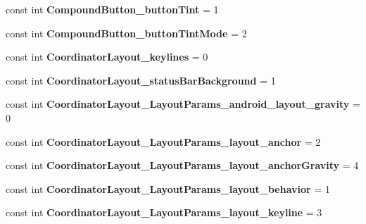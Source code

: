 \begin{DoxyCompactItemize}
const int {\bfseries Compound\+Button\+\_\+button\+Tint} = 1
\item 
\mbox{\label{classXaria_1_1Resource_1_1Styleable_a937c36ddb3e245cdb5b919aa3a6582f9}} 
const int {\bfseries Compound\+Button\+\_\+button\+Tint\+Mode} = 2
\item 
\mbox{\label{classXaria_1_1Resource_1_1Styleable_a0c87026a6c2e0cfe07cfac91069daa77}} 
const int {\bfseries Coordinator\+Layout\+\_\+keylines} = 0
\item 
\mbox{\label{classXaria_1_1Resource_1_1Styleable_a8e5902b5ac3e4c84ccbcf705e83f5a36}} 
const int {\bfseries Coordinator\+Layout\+\_\+status\+Bar\+Background} = 1
\item 
\mbox{\label{classXaria_1_1Resource_1_1Styleable_ac5005b95ba0545092002302bab1dd2e4}} 
const int {\bfseries Coordinator\+Layout\+\_\+\+Layout\+Params\+\_\+android\+\_\+layout\+\_\+gravity} = 0
\item 
\mbox{\label{classXaria_1_1Resource_1_1Styleable_a1af171a822d5141ec8759cf89133cff0}} 
const int {\bfseries Coordinator\+Layout\+\_\+\+Layout\+Params\+\_\+layout\+\_\+anchor} = 2
\item 
\mbox{\label{classXaria_1_1Resource_1_1Styleable_afa1555338fd7715b6b44dac016da45bd}} 
const int {\bfseries Coordinator\+Layout\+\_\+\+Layout\+Params\+\_\+layout\+\_\+anchor\+Gravity} = 4
\item 
\mbox{\label{classXaria_1_1Resource_1_1Styleable_a3bfeedf5279566b448a319bb7315487c}} 
const int {\bfseries Coordinator\+Layout\+\_\+\+Layout\+Params\+\_\+layout\+\_\+behavior} = 1
\item 
\mbox{\label{classXaria_1_1Resource_1_1Styleable_a4014a75cdc6354846c05e5f6a652d65f}} 
const int {\bfseries Coordinator\+Layout\+\_\+\+Layout\+Params\+\_\+layout\+\_\+keyline} = 3
\item 
\mbox{\label{classXaria_1_1Resource_1_1Styleable_a0a6924393e5d08418236c41d6c3196fd}} 

\end{DoxyCompactItemize}
